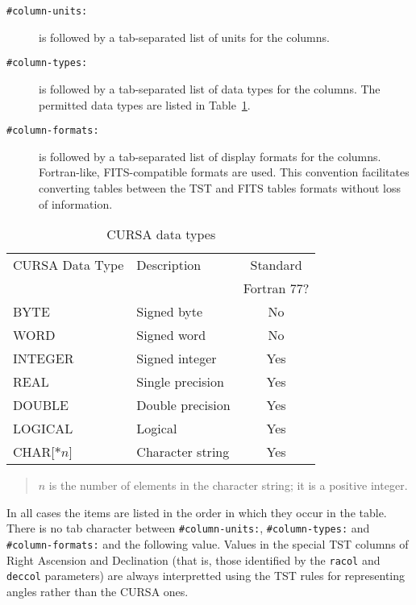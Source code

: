 \documentclass[twoside,11pt]{article}
\renewcommand{\_}{\texttt{\symbol{95}}}
\begin{document}
\begin{description}

  \item[{\tt \#column-units:}] is followed by a tab-separated list of
   units for the columns.

  \item[{\tt \#column-types:}] is followed by a tab-separated list of
   data types for the columns.  The permitted data types are listed in
   Table~\ref{DATA_TYPES}.

  \item[{\tt \#column-formats:}] is followed by a tab-separated list of
   display formats for the columns.  Fortran-like, FITS-compatible formats
   are used.  This convention facilitates converting tables between the
   TST and FITS tables formats without loss of information.

\end{description}

\begin{table}[htbp]

\begin{center}
\begin{tabular}{llc}
CURSA Data Type & Description      & Standard \\
                &                  & Fortran 77? \\ \hline
BYTE            & Signed byte      & No   \\
WORD            & Signed word      & No   \\
INTEGER         & Signed integer   & Yes  \\
REAL            & Single precision & Yes  \\
DOUBLE          & Double precision & Yes  \\
LOGICAL         & Logical          & Yes  \\
CHAR[$*n$]      & Character string & Yes  \\
\end{tabular}

\begin{quote}
$n$ is the number of elements in the character string; it is a positive
integer.
\end{quote}

\caption{CURSA data types \label{DATA_TYPES} }
\end{center}

\end{table}

In all cases the items are listed in the order in which they occur
in the table.  There is no tab character between {\tt \#column-units:},
{\tt \#column-types:} and {\tt \#column-formats:} and the following
value.  Values in the special TST columns of Right Ascension and
Declination (that is, those identified by the {\tt ra\_col} and {\tt
dec\_col} parameters) are always interpretted using the TST rules for
representing angles rather than the CURSA ones.
\end{document}
